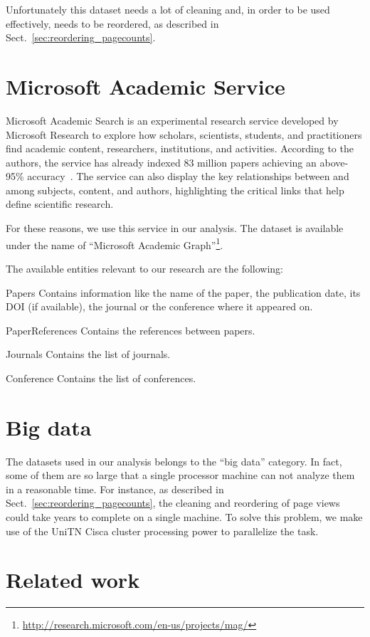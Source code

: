 Unfortunately this dataset needs a lot of cleaning and, in order to be used effectively, needs to be reordered, as described in Sect.~\ref{sec:reordering_pagecounts}.

\section{Microsoft Academic Service}
\label{sec:mag}
Microsoft Academic Search is an experimental research service developed by Microsoft Research to explore how scholars, scientists, students, and practitioners find academic content, researchers, institutions, and activities.
According to the authors, the service has already indexed 83 million papers achieving an above-95\% accuracy~\cite{Sinha2015}.
The service can also display the key relationships between and among subjects, content, and authors, highlighting the critical links that help define scientific research.

For these reasons, we use this service in our analysis.
The dataset is available under the name of ``Microsoft Academic Graph''\footnote{\url{http://research.microsoft.com/en-us/projects/mag/}}.

The available entities relevant to our research are the following:
\begin{description*}
    \item[Papers] Contains information like the name of the paper, the publication date, its \ac{DOI} (if available), the journal or the conference where it appeared on.
    \item[PaperReferences] Contains the references between papers.
    \item[Journals] Contains the list of journals.
    \item[Conference] Contains the list of conferences.
\end{description*}

\section{Big data}
\label{sec:bigdata}


The datasets used in our analysis belongs to the ``big data'' category.
In fact, some of them are so large that a single processor machine can not analyze them in a reasonable time.
For instance, as described in Sect.~\ref{sec:reordering_pagecounts}, the cleaning and reordering of page views could take years  to complete on a single machine.
To solve this problem, we make use of the UniTN Cisca cluster processing power to parallelize the task.


\section{Related work}
\label{sec:relatedwork}

